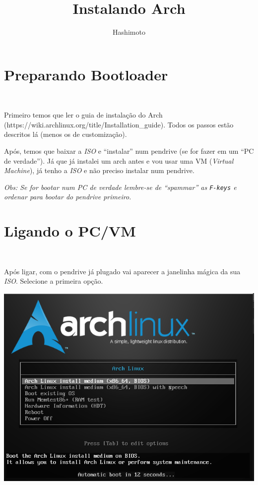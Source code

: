 \documentclass{article}
\newcommand{\obs}[1]{\textit{ Obs:#1 }}
\begin{document}
\title{Instalando Arch}
\author{Hashimoto}
\date{}
\maketitle

\section{Preparando Bootloader}\

Primeiro temos que ler o guia de instalação do Arch
\\ (https://wiki.archlinux.org/title/Installation\_guide).
Todos os passos estão descritos lá
(menos os de customização).

Após, temos que baixar a \emph{ISO}
e ``instalar'' num pendrive
(se for fazer em um ``PC de verdade'').
Já que já instalei um arch antes
e vou usar uma VM (\emph{Virtual Machine}),
já tenho a \emph{ISO} e não preciso instalar num pendrive.

\obs{
Se for bootar num PC de verdade lembre-se
de ``spammar'' as \texttt{F-keys} e
ordenar para bootar do pendrive primeiro.
}

\section{Ligando o PC/VM}\

Após ligar, com o pendrive já plugado
vai aparecer a janelinha mágica da sua \emph{ISO}.
Selecione a primeira opção.

\begin{center}
    \includegraphics[height=.35\textheight]{Imgs/BootLoader.png}
\end{center}
\end{document}
